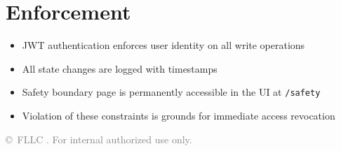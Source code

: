 \documentclass[11pt,a4paper]{article}
\begin{document}
\section{Enforcement}
\begin{itemize}
  \item JWT authentication enforces user identity on all write operations
  \item All state changes are logged with timestamps
  \item Safety boundary page is permanently accessible in the UI at \texttt{/safety}
  \item Violation of these constraints is grounds for immediate access revocation
\end{itemize}

\vfill
\begin{center}
\textcolor{gray}{\small\copyright\ FLLC \the\year.  For internal authorized use only.}
\end{center}
\end{document}
